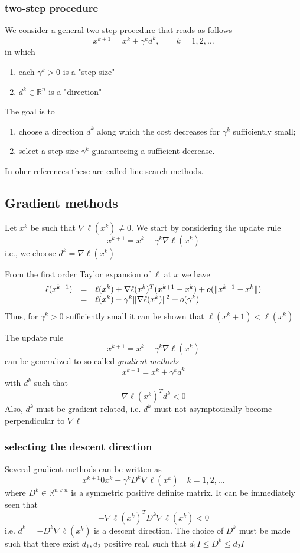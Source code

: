 \documentclass{book}
\newcommand{\R}{\mathbb{R}}
\theoremstyle{definition}
\theoremstyle{remark}
\theoremstyle{remark}
\begin{document}
\subsubsection{two-step procedure}
We consider a general two-step procedure that reads as follows 
\[
    x^{k+1} = x^k+\gamma^k d^k, \qquad k=1,2,\dots
\]
in which 
\begin{enumerate}
    \item each $\gamma^k>0$ is a "step-size" 
    \item $d^k\in\R^n$ is a "direction"
\end{enumerate}
The goal is to 
\begin{enumerate}
    \item choose a direction $d^k$ along which the cost decreases for $\gamma^k$ sufficiently small;
    \item select a step-size $\gamma^k$ guaranteeing a sufficient decrease. 
\end{enumerate}
In oher references these are called line-search methods.
\subsection{Gradient methods}
Let $x^k$ be such that $\nabla\ell(x^k)\neq 0$. We start by considering the update rule 
\[
    x^{k+1} = x^k-\gamma^k\nabla\ell(x^k)
\]
i.e., we choose $d^k = \nabla\ell(x^k)$

From the first order Taylor expansion of $\ell$ at $x$ we have 
\begin{gather*}
    \begin{array}{r c l}
        \ell(x^{k+1}) & = & \ell(x^k)+\nabla\ell(x^k)^T(x^{k+1}-x^k)+o(\|x^{k+1}-x^k\|)\\
                      & = & \ell(x^k)-\gamma^k\|\nabla\ell(x^k)\|^2+o(\gamma^k)
    \end{array}
\end{gather*}
Thus, for $\gamma^k>0$ sufficiently small it can be shown that $\ell(x^k+1)<\ell(x^k)$

The update rule 
\[
    x^{k+1}=x^k-\gamma^k\nabla\ell(x^k)
\]
can be generalized to so called \emph{gradient methods}
\[
    x^{k+1}=x^k+\gamma^kd^k
\]
with $d^k$ such that
\[
    \nabla\ell(x^k)^Td^k<0
\]
Also, $d^k$ must be gradient related, i.e. $d^k$ must not asymptotically become perpendicular to $\nabla\ell$
\subsubsection{selecting the descent direction}
Several gradient methods can be written as 
\[
    x^{k+1} 0 x^k-\gamma^kD^k\nabla\ell(x^k) \quad k=1,2,\dots
\]
where $D^k\in\R^{n\times n}$ is  a symmetric positive definite matrix. It can be immediately seen that 
\[
    -\nabla\ell(x^k)^TD^k\nabla\ell(x^k)<0
\]
i.e. $d^k = -D^k\nabla\ell(x^k)$ is a descent direction. The choice of $D^k$ must be made such that there exist $d_1,d_2$ positive real, such that $d_1 I \leq D^k \leq d_2 I$
\end{document}
